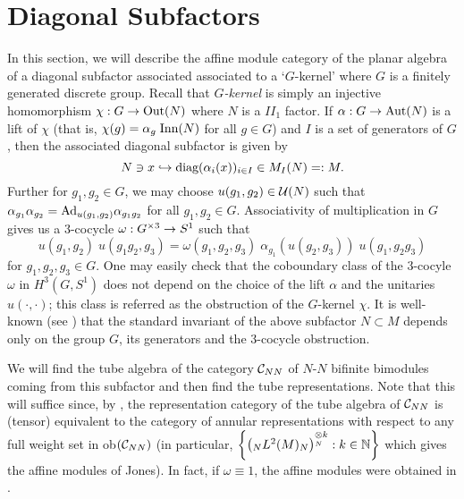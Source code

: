 \section{Diagonal Subfactors}\label{diag}

In this section, we will describe the affine module category of the planar algebra of a diagonal subfactor associated associated to a `$ G $-kernel' where $ G $ is a finitely generated discrete group.
Recall that $ G $\textit{-kernel} is simply an injective homomorphism $ \chi : G \rightarrow \text{Out} (N) $ where $ N $ is a $ II_1 $ factor.
If $ \alpha : G \rightarrow \text{Aut} (N) $ is a lift of $ \chi $ (that is, $ \chi (g) = \alpha_g \; \text{Inn} (N)$ for all $ g \in G $) and $ I $ is a set of generators of $ G $, then the associated diagonal subfactor is given by
\[
N \ni x \hookrightarrow \text{diag} (\alpha_i (x))_{i\in I} \in M_I (N) =: M.
\]
Further for $ g_1,g_2 \in G$, we may choose $ u(g_1,g_2) \in \mathcal U (N) $ such that $ \alpha_{g_1} \alpha_{g_2} = \text{Ad}_{u(g_1,g_2)} \alpha_{g_1g_2} $ for all $ g_1 , g_2 \in G $.
Associativity of multiplication in $ G $ gives us a $ 3 $-cocycle $ \omega : G^{ \times 3} \rightarrow S^1 $ such that
\begin{equation}\label{uomega}
u(g_1, g_2) \; u(g_1 g_2, g_3) = \omega (g_1, g_2, g_3) \;  \alpha_{g_1} (u(g_2, g_3)) \;  u(g_1, g_2 g_3)
\end{equation}
for $ g_1, g_2, g_3 \in G $.
One may easily  check that the coboundary class of the $ 3 $-cocyle $\omega  $ in $ H^3 (G, S^1) $ does not depend on the choice of the lift $ \alpha $ and the unitaries $ u(\cdot , \cdot) $; this class is referred as the obstruction of the $ G $-kernel $ \chi $.
It is well-known (see \cite{frenchpop}) that the standard invariant of the above subfactor $ N \subset M $ depends only on the group $G$, its generators and the $3$-cocycle obstruction.

We will find the tube algebra of the category $ \mathcal C_{NN} $ of $ N $-$ N $ bifinite bimodules coming from this subfactor and then find the tube representations.
Note that this will suffice since, by \cite{GJ}, the representation category of the tube algebra of $ \mathcal C_{NN} $ is (tensor) equivalent to the category of annular representations with respect to any full weight set in ob$ (\mathcal C_{NN}) $ (in particular, $ \left\{\left(_N L^2(M)_N \right)^{\underset{N}{\otimes} k} : k\in \mathbb N\right\} $ which gives the affine modules of Jones).
In fact, if $\omega \equiv 1$, the affine modules were obtained in \cite{GJ}.


